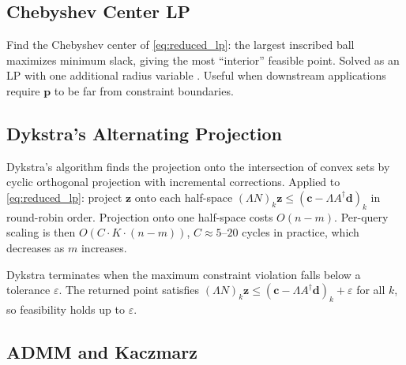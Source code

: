 \documentclass[review,onefignum,onetabnum]{./SIAM_template/siamart171218}
\begin{document}
\subsection{Chebyshev Center LP}
\label{sec:chebyshev}

Find the Chebyshev center of \eqref{eq:reduced_lp}: the largest inscribed ball
maximizes minimum slack, giving the most ``interior'' feasible point.
Solved as an LP with one additional radius variable \cite{Boyd2004}.
Useful when downstream applications require $\mathbf{p}$ to be far from
constraint boundaries.

\subsection{Dykstra's Alternating Projection}
\label{sec:dykstra}

Dykstra's algorithm \cite{Dykstra1983} finds the projection onto the intersection of
convex sets by cyclic orthogonal projection with incremental corrections.
Applied to \eqref{eq:reduced_lp}: project $\mathbf{z}$ onto each half-space
$(\Lambda N)_k \mathbf{z} \leq (\mathbf{c} - \Lambda A^\dagger \mathbf{d})_k$
in round-robin order.  Projection onto one half-space costs $O(n-m)$.
Per-query scaling is then $O(C \cdot K \cdot (n-m))$, $C \approx 5$--$20$
cycles in practice, which decreases as $m$ increases.

Dykstra terminates when the maximum constraint violation falls below a
tolerance $\varepsilon$.  The returned point satisfies
$(\Lambda N)_k \mathbf{z} \leq (\mathbf{c} - \Lambda A^\dagger \mathbf{d})_k
	+ \varepsilon$ for all $k$, so feasibility holds up to $\varepsilon$.

\subsection{ADMM and Kaczmarz}
\label{sec:admm_kaczmarz}
\end{document}

